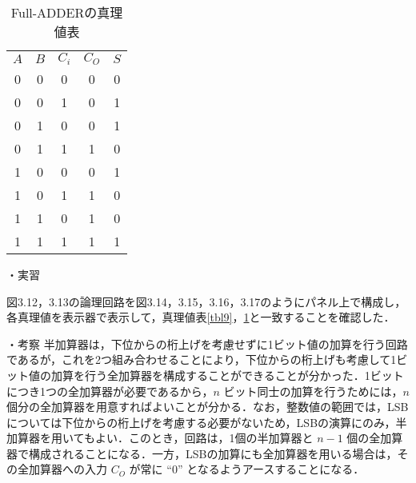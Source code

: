 \newpage
\begin{table}[!h]
    \caption{Full-ADDERの真理値表}
    \label{tbl10}
    \begin{center}
        \begin{tabular}{|c|c|c||c|c|}
            \hline
            $A$ & $B$ & $C_i$ & $C_O$ & $S$ \\
            \hhline{|=|=|=#=|=|}
            0   & 0   & 0     & 0     & 0   \\
            \hline
            0   & 0   & 1     & 0     & 1   \\
            \hline
            0   & 1   & 0     & 0     & 1   \\
            \hline
            0   & 1   & 1     & 1     & 0   \\
            \hline
            1   & 0   & 0     & 0     & 1   \\
            \hline
            1   & 0   & 1     & 1     & 0   \\
            \hline
            1   & 1   & 0     & 1     & 0   \\
            \hline
            1   & 1   & 1     & 1     & 1   \\
            \hline
        \end{tabular}
    \end{center}
\end{table}

\vspace{7mm}
\noindent
・実習 \vspace{2mm}

図3.12，3.13の論理回路を図3.14，3.15，3.16，3.17のようにパネル上で構成し，各真理値を表示器で表示して，真理値表\ref{tbl9}，\ref{tbl10}と一致することを確認した．

\vspace{7mm}
\noindent
・考察 \vspace{2mm}
半加算器は，下位からの桁上げを考慮せずに1ビット値の加算を行う回路であるが，これを2つ組み合わせることにより，下位からの桁上げも考慮して1ビット値の加算を行う全加算器を構成することができることが分かった．1ビットにつき1つの全加算器が必要であるから，$n$ ビット同士の加算を行うためには，$n$ 個分の全加算器を用意すればよいことが分かる．なお，整数値の範囲では，LSBについては下位からの桁上げを考慮する必要がないため，LSBの演算にのみ，半加算器を用いてもよい．このとき，回路は，1個の半加算器と $n - 1$ 個の全加算器で構成されることになる．一方，LSBの加算にも全加算器を用いる場合は，その全加算器への入力 $C_O$ が常に ``0'' となるようアースすることになる．

